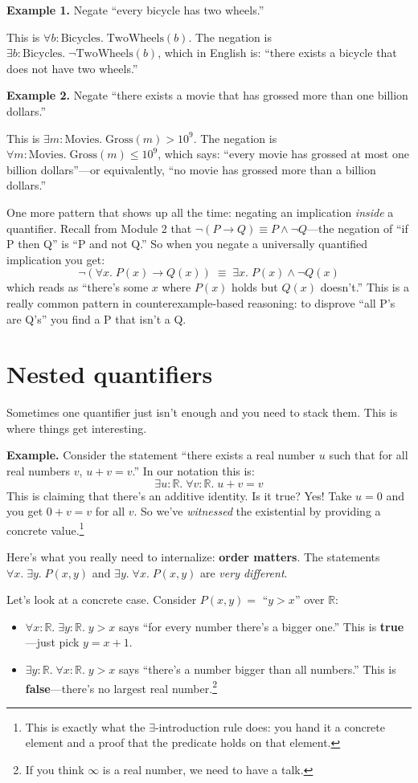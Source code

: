 \documentclass[11pt]{article}
\begin{document}
\textbf{Example 1.} Negate ``every bicycle has two wheels.''

This is $\forall b : \text{Bicycles}.\; \text{TwoWheels}(b)$. The negation is $\exists b : \text{Bicycles}.\; \neg\text{TwoWheels}(b)$, which in English is: ``there exists a bicycle that does not have two wheels.''

\textbf{Example 2.} Negate ``there exists a movie that has grossed more than one billion dollars.''

This is $\exists m : \text{Movies}.\; \text{Gross}(m) > 10^9$. The negation is $\forall m : \text{Movies}.\; \text{Gross}(m) \leq 10^9$, which says: ``every movie has grossed at most one billion dollars''---or equivalently, ``no movie has grossed more than a billion dollars.''

One more pattern that shows up all the time: negating an implication \emph{inside} a quantifier. Recall from Module 2 that $\neg(P \to Q) \equiv P \wedge \neg Q$---the negation of ``if P then Q'' is ``P and not Q.'' So when you negate a universally quantified implication you get:
\[
\neg(\forall x.\; P(x) \to Q(x)) \;\equiv\; \exists x.\; P(x) \wedge \neg Q(x)
\]
which reads as ``there's some $x$ where $P(x)$ holds but $Q(x)$ doesn't.'' This is a really common pattern in counterexample-based reasoning: to disprove ``all P's are Q's'' you find a P that isn't a Q.

\section{Nested quantifiers}
Sometimes one quantifier just isn't enough and you need to stack them. This is where things get interesting.

\textbf{Example.} Consider the statement ``there exists a real number $u$ such that for all real numbers $v$, $u + v = v$.'' In our notation this is:
\[
\exists u : \mathbb{R}.\; \forall v : \mathbb{R}.\; u + v = v
\]
This is claiming that there's an additive identity. Is it true? Yes! Take $u = 0$ and you get $0 + v = v$ for all $v$. So we've \emph{witnessed} the existential by providing a concrete value.\footnote{This is exactly what the $\exists$-introduction rule does: you hand it a concrete element and a proof that the predicate holds on that element.}

Here's what you really need to internalize: \textbf{order matters}. The statements $\forall x.\;\exists y.\; P(x,y)$ and $\exists y.\;\forall x.\; P(x,y)$ are \emph{very different}.

Let's look at a concrete case. Consider $P(x,y) = $ ``$y > x$'' over $\mathbb{R}$:
\begin{itemize}
  \item $\forall x : \mathbb{R}.\;\exists y : \mathbb{R}.\; y > x$ says ``for every number there's a bigger one.'' This is \textbf{true}---just pick $y = x + 1$.
  \item $\exists y : \mathbb{R}.\;\forall x : \mathbb{R}.\; y > x$ says ``there's a number bigger than all numbers.'' This is \textbf{false}---there's no largest real number.\footnote{If you think $\infty$ is a real number, we need to have a talk.}
\end{itemize}
\end{document}
